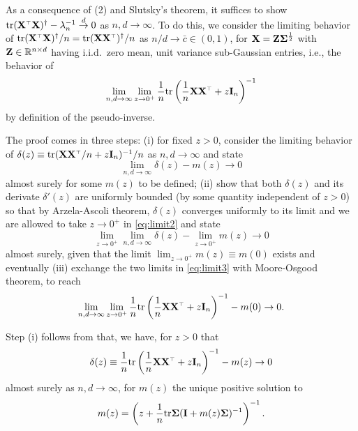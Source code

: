 As a consequence of (2) and Slutsky's theorem, it suffices to show
$\tr(\X^\top \X)^\dag - \lambda_n^{-1} \overset{d}{\to} 0$ as $n,d \to \infty$.
To do this, we consider the limiting behavior of $\tr
(\X^\top \X)^\dagger/n = \tr (\X \X^\top)^\dagger/n$ as $n/d \to \bar c \in
(0,1)$, for $\mathbf X = \mathbf Z \mathbf{\Sigma}^{\frac12}$ with $\mathbf Z \in \mathbb R^{n \times d}$
having i.i.d.~zero mean, unit variance sub-Gaussian entries, i.e., the behavior
of
\begin{equation}\label{eq:limit1}
  \lim_{n,d \to \infty} \lim_{z \to 0^+} \frac1n \tr \left( \frac1n \X \X^\top + z \I_n \right)^{-1}
\end{equation}
by definition of the pseudo-inverse.

The proof comes in three steps: (i) for fixed $z > 0$, consider the limiting behavior of $ \delta(z) \equiv \tr (\X \X^\top/n + z \I_n)^{-1}/n$ as $n,d \to \infty$ and state
\begin{equation}\label{eq:limit2}
  \lim_{n,d \to \infty} \delta(z) - m(z) \to 0
\end{equation}
almost surely for some $m(z)$ to be defined; (ii) show that both $\delta(z)$ and its derivate $\delta'(z)$ are uniformly bounded (by some quantity independent of $z>0$) so that by Arzela-Ascoli theorem, $\delta(z)$ converges uniformly to its limit and we are allowed to take $z \to 0^+$ in \eqref{eq:limit2} and state
\begin{equation}\label{eq:limit3}
  \lim_{z \to 0^+} \lim_{n,d \to \infty} \delta(z) - \lim_{z \to 0^+} m(z) \to 0
\end{equation}
almost surely, given that the limit $\lim_{z \to 0^+} m(z) \equiv m(0)$ exists and eventually (iii) exchange the two limits in \eqref{eq:limit3} with Moore-Osgood theorem, to reach
\[
  \lim_{n,d \to \infty} \lim_{z \to 0^+} \frac1n \tr \left(\frac1n \X \X^\top + z \I_n \right)^{-1} - m(0) \to 0.
\]

Step (i) follows from \cite{silverstein1995empirical} that, we have, for $z > 0$ that
\[
  \delta(z) \equiv \frac1n \tr \left( \frac1n \X \X^\top  + z \I_n \right)^{-1}  - m(z) \to 0
\]
almost surely as $n,d \to \infty$, for $m(z)$ the unique positive solution to
\begin{equation}\label{eq:def-m}
  m(z) = \left( z + \frac1n \mathrm{tr} \mathbf{\Sigma} (\mathbf I + m(z) \mathbf{\Sigma})^{-1} \right)^{-1}.
\end{equation}

